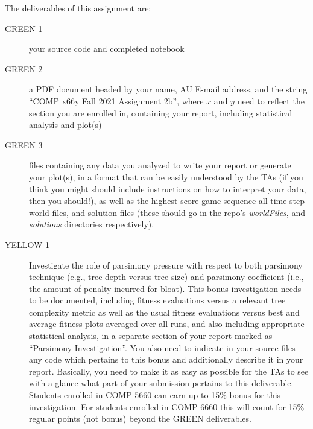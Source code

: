 \documentclass{article}
\begin{document}
The deliverables of this assignment are:
\begin{description}
\item[GREEN 1] your source code and completed notebook
\item[GREEN 2] a PDF document headed by your name, AU E-mail address, and the string ``COMP x66y Fall 2021 Assignment 2b'', where $x$ and $y$ need to reflect the section you are enrolled in, containing your report, including statistical analysis and plot(s)
\item[GREEN 3] files containing any data you analyzed to write your report or generate your plot(s), in a format that can be easily understood by the TAs (if you think you might should include instructions on how to interpret your data, then you should!), as well as the highest-score-game-sequence all-time-step world files, and solution files (these should go in the repo's \emph{worldFiles}, and \emph{solutions} directories respectively).

\item[YELLOW 1] Investigate the role of parsimony pressure with respect to both parsimony technique (e.g., tree depth versus tree size) and parsimony coefficient (i.e., the amount of penalty incurred for bloat). This bonus investigation needs to be documented, including fitness evaluations versus a relevant tree complexity metric as well as the usual fitness evaluations versus best and average fitness plots averaged over all runs, and also including appropriate statistical analysis, in a separate section of your report marked as ``Parsimony Investigation''. You also need to indicate in your source files any code which pertains to this bonus and additionally describe it in your report. Basically, you need to make it as easy as possible for the TAs to see with a glance what part of your submission pertains to this deliverable.
Students enrolled in COMP 5660 can earn up to 15\% bonus for this investigation. For students enrolled in COMP 6660 this will count for 15\% regular points (not bonus) beyond the GREEN deliverables. 


\end{description}
\end{document}
